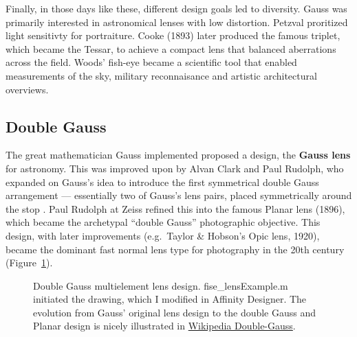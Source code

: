 \documentclass[
  letterpaper,
]{book}
\begin{document}
Finally, in those days like these, different design goals led to
diversity. Gauss was primarily interested in astronomical lenses with
low distortion. Petzval proritized light sensitivty for portraiture.
Cooke (1893) later produced the famous triplet, which became the Tessar,
to achieve a compact lens that balanced aberrations across the field.
Woods' fish-eye became a scientific tool that enabled measurements of
the sky, military reconnaisance and artistic architectural overviews.

\subsection{Double Gauss}\label{sec-optics-double-gauss}

The great mathematician Gauss implemented proposed a design, the
\textbf{Gauss lens} for astronomy. This was improved upon by Alvan Clark
and Paul Rudolph, who expanded on Gauss's idea to introduce the first
symmetrical double Gauss arrangement --- essentially two of Gauss's lens
pairs, placed symmetrically around the stop . Paul Rudolph at Zeiss
refined this into the famous Planar lens (1896), which became the
archetypal ``double Gauss'' photographic objective. This design, with
later improvements (e.g.~Taylor \& Hobson's Opic lens, 1920), became the
dominant fast normal lens type for photography in the 20th century
(Figure~\ref{fig-double-gauss}).

\begin{figure}


\caption{\label{fig-double-gauss}Double Gauss multielement lens design.
fise\_lensExample.m initiated the drawing, which I modified in Affinity
Designer. The evolution from Gauss' original lens design to the double
Gauss and Planar design is nicely illustrated in
\href{https://en.wikipedia.org/wiki/Double-Gauss_lens}{Wikipedia
Double-Gauss}.}

\end{figure}%
\end{document}
